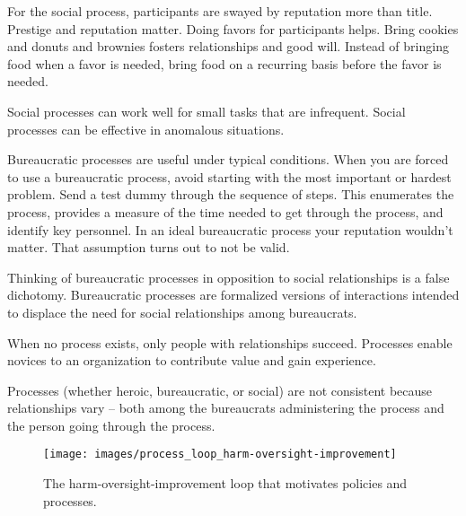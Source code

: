 For the social process, participants are swayed by reputation more than title. Prestige and reputation matter. Doing favors for participants helps. Bring cookies and donuts and brownies fosters relationships and good will. 
Instead of bringing food when a favor is needed, bring food on a recurring basis before the favor is needed.

Social processes can work well for small tasks that are infrequent.
Social processes can be effective in anomalous situations.

Bureaucratic processes are useful under typical conditions.
When you are forced to use a bureaucratic process, avoid starting with the most important or hardest problem. Send a test dummy through the sequence of steps. This enumerates the process, provides a measure of the time needed to get through the process, and identify key personnel. In an ideal bureaucratic process your reputation wouldn't matter. That assumption turns out to not be valid. 

Thinking of bureaucratic processes in opposition to social relationships is a false dichotomy. Bureaucratic processes are formalized versions of interactions intended to displace the need for social relationships among bureaucrats.



When no process exists, only people with relationships succeed. Processes enable novices to an organization to contribute value and gain experience. 



Processes (whether heroic, bureaucratic, or social) are not consistent because relationships vary -- both among the bureaucrats administering the process and the person going through the process.






\begin{figure}
    \centering
    \texttt{[image: images/process\_loop\_harm-oversight-improvement]}
    \caption{The harm-oversight-improvement loop that motivates policies and processes.}
    \label{fig:harm-oversight-improvement}
\end{figure}










